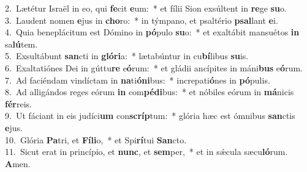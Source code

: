 {2.~}Lætétur Israël in eo, qui \textbf{fe}cit \textbf{e}um:~* et fílii Sion exsúltent in \textbf{re}ge \textbf{su}o.\\
{3.~}Laudent nomen \textbf{e}jus in \textbf{cho}ro:~* in týmpano, et psaltério \textbf{psal}lant \textbf{e}i.\\
{4.~}Quia beneplácitum est Dómino in \textbf{pó}pulo \textbf{su}o:~* et exaltábit mansuétos \textbf{in} sa\textbf{lú}tem.\\
{5.~}Exsultábunt \textbf{san}cti in \textbf{gló}\textbf{ri}a:~* lætabúntur in cu\textbf{bí}libus \textbf{su}is.\\
{6.~}Exaltatiónes Dei in gúttu\textbf{re} e\textbf{ó}rum:~* et gládii ancípites in máni\textbf{bus} e\textbf{ó}rum.\\
{7.~}Ad faciéndam vindíctam in \textbf{na}ti\textbf{ó}\textbf{ni}bus:~* increpati\textbf{ó}nes in \textbf{pó}pulis.\\
{8.~}Ad alligándos reges eórum \textbf{in} com\textbf{pé}\textbf{di}bus:~* et nóbiles eórum in \textbf{má}nicis \textbf{fér}reis.\\
{9.~}Ut fáciant in eis judíci\textbf{um} con\textbf{scríp}tum:~* glória hæc est ómnibus \textbf{san}ctis \textbf{e}jus.\\
{10.~}Glória \textbf{Pa}tri, et \textbf{Fí}\textbf{li}o,~* et Spi\textbf{rí}tui \textbf{San}cto.\\
{11.~}Sicut erat in princípio, et \textbf{nunc}, et \textbf{sem}per,~* et in sǽcula sæcu\textbf{ló}rum. \textbf{A}men.\\
